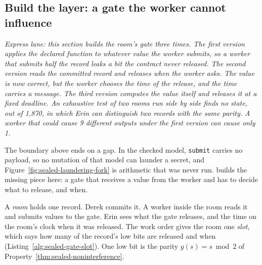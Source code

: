 %
%
\subsection{Build the layer: a gate the worker cannot influence}
\label{sec:sealed-gate}

\noindent\emph{Express lane: this section builds the room's gate three
times. The first version applies the declared function to whatever value
the worker submits, so a worker that submits half the record leaks a bit
the contract never released. The second version reads the committed record
and releases when the worker asks. The value is now correct, but the
worker chooses the time of the release, and the time carries a message.
The third version computes the value itself and releases it at a fixed
deadline. An exhaustive test of two rooms run side by side finds no state,
out of 1,870, in which Erin can distinguish two records with the same
parity. A worker that could cause 9 different outputs under the first
version can cause only 1.}

The boundary above ends on a gap. In the checked model, \texttt{submit}
carries no payload, so no mutation of that model can launder a secret, and
Figure~\ref{fig:sealed-laundering-fork} is arithmetic that was never run.
\pdkernelname{} builds the missing piece here: a gate that receives a
value from the worker and has to decide what to release, and when.

A \emph{room} holds one record. Derek commits it. A worker inside the room
reads it and submits values to the gate. Erin sees what the gate releases,
and the time on the room's clock when it was released. The work order
gives the room one \emph{slot}, which says how many of the record's low
bits are released and when (Listing~\ref{alg:sealed-gate-slot}). One low
bit is the parity $g(s)=s\bmod 2$ of
Property~\ref{thm:sealed-noninterference}.

